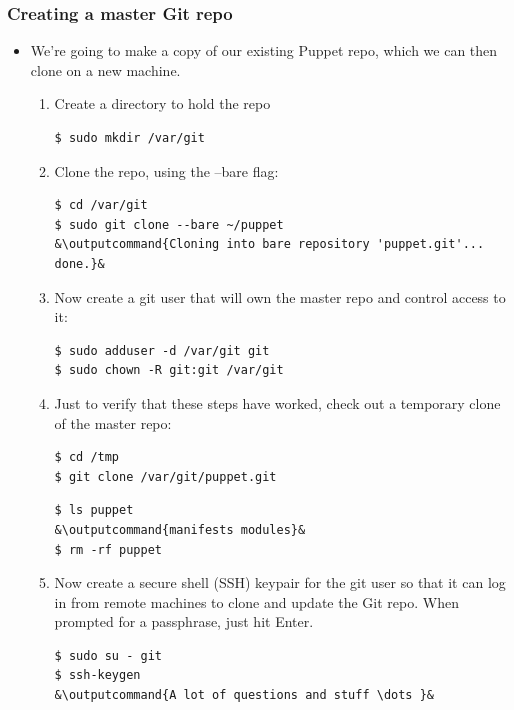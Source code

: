 \documentclass{beamer}
\newcommand{\outputcommand}[1]{\color{darkgreen}{#1}}
\begin{document}
\begin{frame}
\frametitle{Creating a master Git repo}

\begin{itemize}
 \item We're going to make a copy of our existing Puppet repo, which we can then clone on
a new machine.
\begin{enumerate}
\item Create a directory to hold the repo
\lstset{language=shell}
\begin{lstlisting}[escapechar=&]
$ sudo mkdir /var/git
\end{lstlisting}

\item Clone the repo, using the --bare flag:
\lstset{language=shell}
\begin{lstlisting}[escapechar=&]
$ cd /var/git
$ sudo git clone --bare ~/puppet
&\outputcommand{Cloning into bare repository 'puppet.git'...
done.}&
\end{lstlisting}

\item Now create a git user that will own the master repo and control access to it:
\lstset{language=shell}
\begin{lstlisting}[escapechar=&]
$ sudo adduser -d /var/git git
$ sudo chown -R git:git /var/git
\end{lstlisting}

\item Just to verify that these steps have worked, check out a temporary clone of the
master repo:
\lstset{language=shell}
\begin{lstlisting}[escapechar=&]
$ cd /tmp
$ git clone /var/git/puppet.git
\end{lstlisting}

\lstset{language=shell}
\begin{lstlisting}[escapechar=&]
$ ls puppet
&\outputcommand{manifests modules}&
$ rm -rf puppet
\end{lstlisting}

\item Now create a secure shell (SSH) keypair for the git user so that it can log in
from remote machines to clone and update the Git repo. When prompted for a
passphrase, just hit Enter.
\lstset{language=shell}
\begin{lstlisting}[escapechar=&]
$ sudo su - git
$ ssh-keygen
&\outputcommand{A lot of questions and stuff \dots }&
\end{lstlisting}


\end{enumerate}
\end{itemize}
\end{frame}
\end{document}
